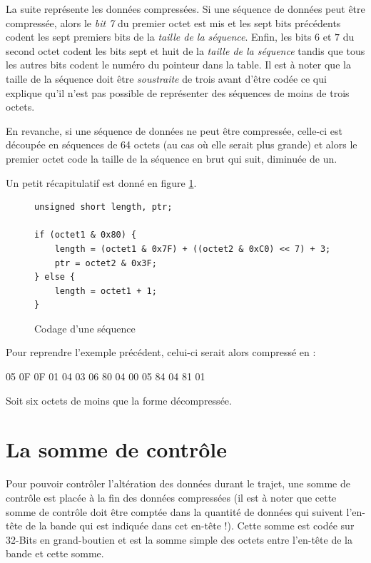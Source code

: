 La suite représente les données compressées. Si une séquence de données
peut être compressée, alors le \emph{bit 7} du premier octet est mis et
les sept bits précédents codent les sept premiers bits de la \emph{taille de
la séquence}. Enfin, les bits $6$ et $7$ du second octet codent les bits
sept et huit de la \emph{taille de la séquence} tandis que tous les autres
bits codent le numéro du pointeur dans la table. Il est à noter que la taille
de la séquence doit être \emph{soustraite} de trois avant d'être codée ce qui
explique qu'il n'est pas possible de représenter des séquences de moins de
trois octets.

En revanche, si une séquence de données ne peut être compressée, celle-ci
est découpée en séquences de 64 octets (au cas où elle serait plus grande)
et alors le premier octet code la taille de la séquence en brut qui suit,
diminuée de un.

Un petit récapitulatif est donné en figure \ref{fig:code_comp}.
\begin{figure}[!ht]
\centering
\begin{verbatim}
unsigned short length, ptr;

if (octet1 & 0x80) {
    length = (octet1 & 0x7F) + ((octet2 & 0xC0) << 7) + 3;
    ptr = octet2 & 0x3F;
} else {
    length = octet1 + 1;
}
\end{verbatim}
\caption{Codage d'une séquence}
\label{fig:code_comp}
\end{figure}

Pour reprendre l'exemple précédent, celui-ci serait alors compressé en :
\begin{exemple}
05 0F 0F 01 04 03 06 80 04 00 05 84 04 81 01
\end{exemple}

Soit six octets de moins que la forme décompressée.

\section{La somme de contrôle}
Pour pouvoir contrôler l'altération des données durant le trajet, une somme de
contrôle est placée à la fin des données compressées (il est à noter que cette
somme de contrôle doit être comptée dans la quantité de données qui suivent
l'en-tête de la bande qui est indiquée dans cet en-tête !). Cette somme est
codée sur 32-Bits en grand-boutien et est la somme simple des octets entre
l'en-tête de la bande et cette somme.
